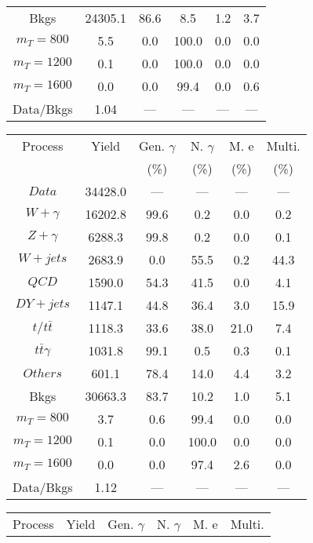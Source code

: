 \begin{figure}
\begin{minipage}[c]{0.32\textwidth}
{\begin{tabular}{cccccc}
Bkgs &  24305.1 &  86.6 &  8.5 &  1.2 &  3.7\\
$ m_{T} = 800 $ &  5.5 &  0.0 &  100.0 &  0.0 &  0.0\\
$ m_{T} = 1200 $ &  0.1 &  0.0 &  100.0 &  0.0 &  0.0\\
$ m_{T} = 1600 $ &  0.0 &  0.0 &  99.4 &  0.0 &  0.6\\
Data/Bkgs &  1.04 &  --- &  --- &  --- &  ---\\
\hline
\end{tabular}
}
\end{minipage}
\begin{minipage}[c]{0.32\textwidth}
\centering
\tiny{
\begin{tabular}{cccccc}
\hline
Process & Yield & Gen. $\gamma$ & N. $\gamma$ & M. e & Multi. \\
 &  & (\%) & (\%) & (\%) & (\%)  \\
\hline
                                                                      $ Data $ &  34428.0 &  --- &  --- &  --- &  ---\\
$ W+\gamma $ &  16202.8 &  99.6 &  0.2 &  0.0 &  0.2\\
$ Z+\gamma $ &  6288.3 &  99.8 &  0.2 &  0.0 &  0.1\\
$ W+jets $ &  2683.9 &  0.0 &  55.5 &  0.2 &  44.3\\
$ QCD $ &  1590.0 &  54.3 &  41.5 &  0.0 &  4.1\\
$ DY+jets $ &  1147.1 &  44.8 &  36.4 &  3.0 &  15.9\\
$ t/t\bar{t} $ &  1118.3 &  33.6 &  38.0 &  21.0 &  7.4\\
$ t\bar{t}\gamma $ &  1031.8 &  99.1 &  0.5 &  0.3 &  0.1\\
$ Others $ &  601.1 &  78.4 &  14.0 &  4.4 &  3.2\\
Bkgs &  30663.3 &  83.7 &  10.2 &  1.0 &  5.1\\
$ m_{T} = 800 $ &  3.7 &  0.6 &  99.4 &  0.0 &  0.0\\
$ m_{T} = 1200 $ &  0.1 &  0.0 &  100.0 &  0.0 &  0.0\\
$ m_{T} = 1600 $ &  0.0 &  0.0 &  97.4 &  2.6 &  0.0\\
Data/Bkgs &  1.12 &  --- &  --- &  --- &  ---\\
\hline
\end{tabular}
}
\end{minipage}
\begin{minipage}[c]{0.32\textwidth}
\centering
\tiny{
\begin{tabular}{cccccc}
\hline
Process & Yield & Gen. $\gamma$ & N. $\gamma$ & M. e & Multi. \\

\end{tabular}}
\end{minipage}
\end{figure}
